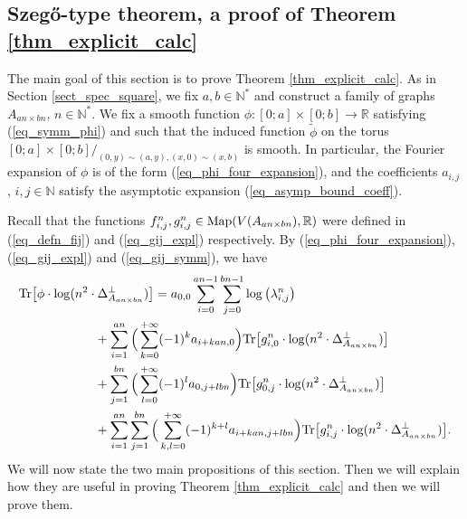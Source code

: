 \documentclass[12pt]{article}
\numberwithin{equation}{section}
\theoremstyle{theorem}
\theoremstyle{definition}
\theoremstyle{remark}
\newcommand{\real}{\mathbb{R}}
\newcommand{\nat}{\mathbb{N}}
\newcommand{\laplcomp}{\Delta}
\newcommand{\tr}[1]{{\rm{Tr}} \big[ #1 \big]}
\begin{document}
	\subsection{Szegő-type theorem, a proof of Theorem \ref{thm_explicit_calc}}\label{sect_szego_thm}
		The main goal of this section is to prove Theorem \ref{thm_explicit_calc}.
		As in Section \ref{sect_spec_square}, we fix $a, b \in \nat^*$ and construct a family of graphs $A_{an \times bn}$, $n \in \nat^*$. 
		We fix a smooth function $\phi : [0; a] \times [0; b] \to \real$ satisfying (\ref{eq_symm_phi}) and such that the induced function $\tilde{\phi}$ on the torus $[0; a] \times [0; b]/_{(0, y) \sim (a, y), (x, 0) \sim (x, b)}$ is smooth. 
		In particular, the Fourier expansion of $\phi$ is of the form (\ref{eq_phi_four_expansion}), and the coefficients $a_{i, j}$, $i, j \in \nat$ satisfy the asymptotic expansion (\ref{eq_asymp_bound_coeff}).
		\par 
		Recall that the functions $f_{i, j}^{n}, g_{i, j}^{n} \in {\rm{Map}}(V(A_{an \times bn}), \real)$ were defined in (\ref{eq_defn_fij}) and (\ref{eq_gij_expl}) respectively.
		By (\ref{eq_phi_four_expansion}), (\ref{eq_gij_expl}) and (\ref{eq_gij_symm}), we have
		\begin{equation}\label{eq_tr_phi_exp_first}
		\begin{aligned}
			& \tr{\phi \cdot \log (n^2 \cdot \laplcomp_{A_{an \times bn}}^{\perp})}
			=
			a_{0, 0} \sum_{i = 0}^{an - 1} \sum_{j = 0}^{bn - 1} \log \big( \lambda_{i, j}^{n} \big)
			\\
			& 
			\qquad \qquad \qquad
			+
			\sum_{i = 1}^{an} \Big( \sum_{k = 0}^{+\infty} (-1)^k a_{i + kan, 0} \Big) \tr{g_{i, 0}^{n} \cdot \log (n^2 \cdot \laplcomp_{A_{an \times bn}}^{\perp})}
			\\
			& 
			\qquad \qquad \qquad
			+
			\sum_{j = 1}^{bn} \Big( \sum_{l = 0}^{+\infty} (-1)^l a_{0, j + lbn} \Big) \tr{g_{0, j}^{n} \cdot \log (n^2 \cdot \laplcomp_{A_{an \times bn}}^{\perp})}
			\\
			& 
			\qquad \qquad \qquad
			+
			\sum_{i = 1}^{an} \sum_{j = 1}^{bn} \Big( \sum_{k, l = 0}^{+\infty} (-1)^{k + l} a_{i + kan, j + lbn} \Big) \tr{g_{i, j}^{n} \cdot \log (n^2 \cdot \laplcomp_{A_{an \times bn}}^{\perp})}.
		\end{aligned}
		\end{equation}
		We will now state the two main propositions of this section. Then we will explain how they are useful in proving Theorem \ref{thm_explicit_calc} and then we will prove them.
\end{document}
